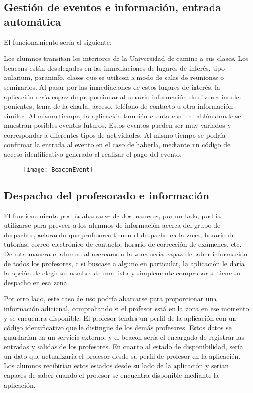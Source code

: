 \subsection{Gestión de eventos e información, entrada automática}

El funcionamiento sería el siguiente: 

Los alumnos transitan los interiores de la Universidad de camino a sus clases. Los beacons están desplegados en las inmediaciones de lugares de interés, tipo aularium, paraninfo, clases que se utilicen a modo de salas de reuniones o seminarios. Al pasar por las inmediaciones de estos lugares de interés, la aplicación sería capaz de proporcionar al usuario información de diversa índole: ponientes, tema de la charla, acceso, teléfono de contacto u otra información similar.  Al mismo tiempo, la aplicación también cuenta con un tablón donde se muestran posibles eventos futuros. Estos eventos pueden ser muy variados y corresponder a diferentes tipos de actividades. Al mismo tiempo se podría confirmar la entrada al evento en el caso de haberla, mediante un código de acceso identificativo generado al realizar el pago del evento.

\begin{figure}[H]
	\centering
	\texttt{[image: BeaconEvent]}
	\label{fig:eventBeacon}
\end{figure}

\subsection{Despacho del profesorado e información}

El funcionamiento podría abarcarse de dos maneras, por un lado, podría utilizarse para proveer a los alumnos de información acerca del grupo de despachos, aclarando que profesores tienen el despacho en la zona, horario de tutorías, correo electrónico de contacto, horario de corrección de exámenes, etc. De esta manera el alumno al acercarse a la zona sería capaz de saber información de todos los profesores, o si buscase a alguno en particular, la aplicación le daría la opción de elegir su nombre de una lista y simplemente comprobar si tiene su despacho en esa zona. 

Por otro lado, este caso de uso podría abarcarse para proporcionar una información adicional, comprobando si el profesor está en la zona en ese momento y se encuentra disponible. El profesor tendrá un perfil de la aplicación con un código identificativo que le distingue de los demás profesores. Estos datos se guardarían en un servicio externo, y el beacon sería el encargado de registrar las entradas y salidas de los profesores. En cuanto al estado de disponibilidad, sería un dato que actualizaría el profesor desde su perfil de profesor en la aplicación. Los alumnos recibirían estos estados desde su lado de la aplicación y serían capaces de saber cuando el profesor se encuentra disponible mediante la aplicación. 

